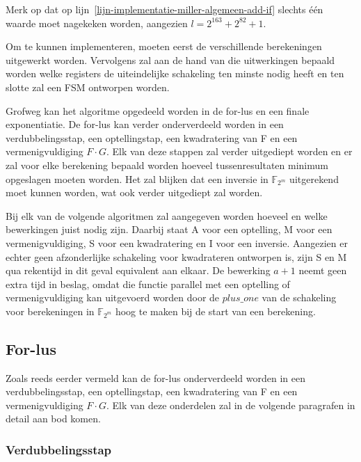 Merk op dat op lijn~\ref{lijn-implementatie-miller-algemeen-add-if} slechts \'e\'en waarde moet nagekeken worden, aangezien $l = 2^{163} + 2^{82} + 1$.

Om  te kunnen implementeren, moeten eerst de verschillende berekeningen uitgewerkt worden. Vervolgens zal aan de hand van die uitwerkingen bepaald worden welke registers de uiteindelijke schakeling ten minste nodig heeft en ten slotte zal een FSM ontworpen worden.

Grofweg kan het algoritme opgedeeld worden in de for-lus  en een finale exponentiatie. De for-lus kan verder onderverdeeld worden in een verdubbelingsstap, een optellingstap, een kwadratering van F en een vermenigvuldiging $F \cdot G$. Elk van deze stappen zal verder uitgediept worden en er zal voor elke berekening bepaald worden hoeveel tussenresultaten minimum opgeslagen moeten worden. Het zal blijken dat een inversie in $\mathbb{F}_{2^m}$ uitgerekend moet kunnen worden, wat ook verder uitgediept zal worden.

Bij elk van de volgende algoritmen zal aangegeven worden hoeveel en welke bewerkingen juist nodig zijn. Daarbij staat \textsf{A} voor een optelling, \textsf{M} voor een vermenigvuldiging, \textsf{S} voor een kwadratering en \textsf{I} voor een inversie. Aangezien er echter geen afzonderlijke schakeling voor kwadrateren ontworpen is, zijn \textsf{S} en \textsf{M} qua rekentijd in dit geval equivalent aan elkaar. De bewerking $a + 1$ neemt geen extra tijd in beslag, omdat die functie parallel met een optelling of vermenigvuldiging kan uitgevoerd worden door de $plus\_one$ van de schakeling voor berekeningen in $\mathbb{F}_{2^m}$ hoog te maken bij de start van een berekening.

\subsection{For-lus}\label{subsectie-implementatie-miller-forlus}

Zoals reeds eerder vermeld kan de for-lus onderverdeeld worden in een verdubbelingsstap, een optellingstap, een kwadratering van F en een vermenigvuldiging $F \cdot G$. Elk van deze onderdelen zal in de volgende paragrafen in detail aan bod komen.

\subsubsection{Verdubbelingsstap}

